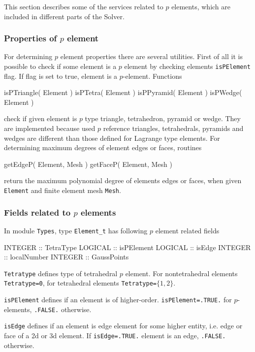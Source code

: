 This section describes some of the services related to $p$ elements, which are included in different parts of the Solver. 

\subsubsection{Properties of $p$ element}

For determining $p$ element properties there are several utilities. First of all it is possible to check if some element is a $p$ element by checking elements \texttt{isPElement} flag. If flag is set to true, element is a $p$-element. Functions 

\ttbegin
isPTriangle( Element )
isPTetra( Element )
isPPyramid( Element )
isPWedge( Element )
\ttend

\noindent check if given element is $p$ type triangle, tetrahedron, pyramid or wedge. They are implemented because used $p$ reference triangles, tetrahedrals, pyramids and wedges are different than those defined for Lagrange type elements.  For determining maximum degrees of element edges or faces, routines 

\ttbegin
getEdgeP( Element, Mesh )
getFaceP( Element, Mesh )
\ttend 

\noindent return the maximum polynomial degree of elements edges or faces, when given \texttt{Element} and finite element mesh \texttt{Mesh}.

\subsubsection{Fields related to $p$ elements}

In module \texttt{Types}, type \texttt{Element\_t} has following $p$ element related fields

\ttbegin
INTEGER :: TetraType
LOGICAL :: isPElement
LOGICAL :: isEdge
INTEGER :: localNumber
INTEGER :: GaussPoints 
\ttend

\texttt{Tetratype} defines type of tetrahedral $p$ element. For nontetrahedral elements \texttt{Tetratype=0}, for tetrahedral elements \texttt{Tetratype=}$\{1,2\}$. 

\texttt{isPElement} defines if an element is of higher-order. \texttt{isPElement=.TRUE.} for $p$-elements, \texttt{.FALSE.} otherwise.

\texttt{isEdge} defines if an element is edge element for some higher entity, i.e. edge or face of a 2d or 3d element. If \texttt{isEdge=.TRUE.} element is an edge, \texttt{.FALSE.} otherwise.

